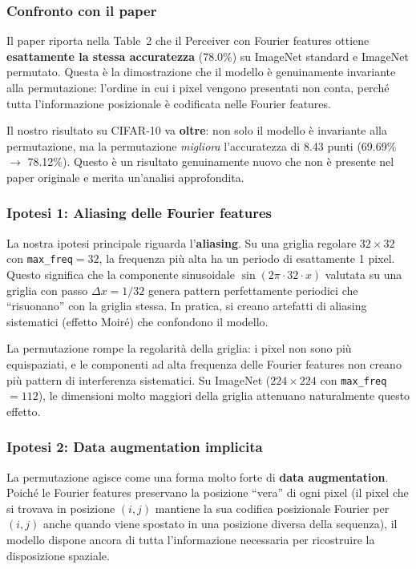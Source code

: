 \documentclass[12pt,a4paper]{article}
\begin{document}
\subsubsection{Confronto con il paper}

Il paper riporta nella Table~2 che il Perceiver con Fourier features ottiene \textbf{esattamente la stessa accuratezza} (78.0\%) su ImageNet standard e ImageNet permutato. Questa \`e la dimostrazione che il modello \`e genuinamente invariante alla permutazione: l'ordine in cui i pixel vengono presentati non conta, perch\'e tutta l'informazione posizionale \`e codificata nelle Fourier features.

Il nostro risultato su CIFAR-10 va \textbf{oltre}: non solo il modello \`e invariante alla permutazione, ma la permutazione \emph{migliora} l'accuratezza di 8.43 punti (69.69\% $\to$ 78.12\%). Questo \`e un risultato genuinamente nuovo che non \`e presente nel paper originale e merita un'analisi approfondita.

\subsubsection{Ipotesi 1: Aliasing delle Fourier features}

La nostra ipotesi principale riguarda l'\textbf{aliasing}. Su una griglia regolare $32 \times 32$ con \texttt{max\_freq}$= 32$, la frequenza pi\`u alta ha un periodo di esattamente 1 pixel. Questo significa che la componente sinusoidale $\sin(2\pi \cdot 32 \cdot x)$ valutata su una griglia con passo $\Delta x = 1/32$ genera pattern perfettamente periodici che ``risuonano'' con la griglia stessa. In pratica, si creano artefatti di aliasing sistematici (effetto Moir\'e) che confondono il modello.

La permutazione rompe la regolarit\`a della griglia: i pixel non sono pi\`u equispaziati, e le componenti ad alta frequenza delle Fourier features non creano pi\`u pattern di interferenza sistematici. Su ImageNet ($224 \times 224$ con \texttt{max\_freq}$= 112$), le dimensioni molto maggiori della griglia attenuano naturalmente questo effetto.

\subsubsection{Ipotesi 2: Data augmentation implicita}

La permutazione agisce come una forma molto forte di \textbf{data augmentation}. Poich\'e le Fourier features preservano la posizione ``vera'' di ogni pixel (il pixel che si trovava in posizione $(i, j)$ mantiene la sua codifica posizionale Fourier per $(i, j)$ anche quando viene spostato in una posizione diversa della sequenza), il modello dispone ancora di tutta l'informazione necessaria per ricostruire la disposizione spaziale.
\end{document}
